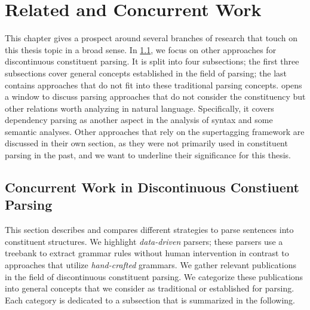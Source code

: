 \documentclass[../document.tex]{subfiles}
\begin{document}
    \chapter{Related and Concurrent Work}\label{sec:literature}
    This chapter gives a prospect around several branches of research that touch on this thesis topic in a broad sense.
    In \cref{sec:literature:constituency}, we focus on other approaches for discontinuous constituent parsing.
    It is split into four subsections; the first three subsections cover general concepts established in the field of parsing; the last contains approaches that do not fit into these traditional parsing concepts.
     opens a window to discuss parsing approaches that do not consider the constituency but other relations worth analyzing in natural language.
    Specifically, it covers dependency parsing as another aspect in the analysis of syntax and some semantic analyses.
    Other approaches that rely on the supertagging framework are discussed in their own section, as they were not primarily used in constituent parsing in the past, and we want to underline their significance for this thesis.

    \section{Concurrent Work in Discontinuous Constiuent Parsing}\label{sec:literature:constituency}
    This section describes and compares different strategies to parse sentences into constituent structures.
    We highlight \emph{data-driven} parsers; these parsers use a treebank to extract grammar rules without human intervention \citep[cf.\@][Section~1.1]{Kal10} in contrast to approaches that utilize \emph{hand-crafted} grammars.
    We gather relevant publications in the field of discontinuous constituent parsing.
    We categorize these publications into general concepts that we consider as traditional or established for parsing.
    Each category is dedicated to a subsection that is summarized in the following.
\end{document}
